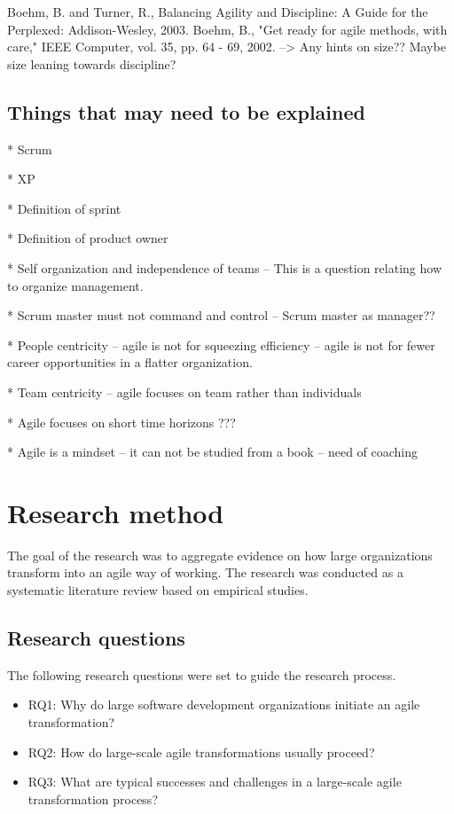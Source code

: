 \documentclass[preprint,authoryear,12pt]{elsarticle}
\begin{document}
Boehm, B. and Turner, R., Balancing Agility and Discipline: A Guide for the
Perplexed: Addison-Wesley, 2003.
Boehm, B., "Get ready for agile methods, with care," IEEE Computer, vol. 35,
pp. 64 - 69, 2002.
--> Any hints on size?? Maybe size leaning towards discipline?

\subsection{Things that may need to be explained}

* Scrum

* XP

* Definition of sprint

* Definition of product owner

* Self organization and independence of teams -- This is a question relating how
  to organize management. 

* Scrum master must not command and control -- Scrum master as manager??

* People centricity -- agile is not for squeezing efficiency -- agile is not for
  fewer career opportunities in a flatter organization.

* Team centricity -- agile focuses on team rather than individuals

* Agile focuses on short time horizons ???

* Agile is a mindset -- it can not be studied from a book -- need of coaching

\section{Research method}
\label{sec:method}

The goal of the research was to aggregate evidence on how large organizations
transform into an agile way of working. The research was conducted as a
systematic literature review based on empirical studies.

\subsection{Research questions}

The following research questions were set to guide the research process.

\begin{itemize}

\item
RQ1: Why do large software development organizations initiate an agile
transformation?

\item
RQ2: How do large-scale agile transformations usually proceed?

\item
RQ3: What are typical successes and challenges in a large-scale agile
     transformation process?

\end{itemize}
\end{document}

